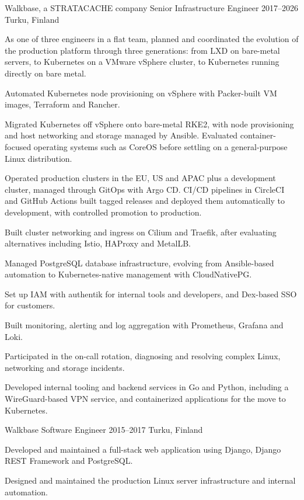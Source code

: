 \cventry
    {Walkbase, a STRATACACHE company}
    {Senior Infrastructure Engineer}
    {2017--2026}
    {Turku, Finland}

\begin{cvitems}
    \item As one of three engineers in a flat team, planned and coordinated
          the evolution of the production platform through three generations:
          from LXD on bare-metal servers, to Kubernetes on a VMware vSphere
          cluster, to Kubernetes running directly on bare metal.
    \item Automated Kubernetes node provisioning on vSphere with Packer-built
          VM images, Terraform and Rancher.
    \item Migrated Kubernetes off vSphere onto bare-metal RKE2, with node
          provisioning and host networking and storage managed by Ansible.
          Evaluated container-focused operating systems such as CoreOS before
          settling on a general-purpose Linux distribution.
    \item Operated production clusters in the EU, US and APAC plus a
          development cluster, managed through GitOps with Argo CD. CI/CD
          pipelines in CircleCI and GitHub Actions built tagged releases and
          deployed them automatically to development, with controlled
          promotion to production.
    \item Built cluster networking and ingress on Cilium and Traefik, after
          evaluating alternatives including Istio, HAProxy and MetalLB.
    \item Managed PostgreSQL database infrastructure, evolving from Ansible-based
          automation to Kubernetes-native management with CloudNativePG.
    \item Set up IAM with authentik for internal tools and developers, and
          Dex-based SSO for customers.
    \item Built monitoring, alerting and log aggregation with Prometheus, Grafana and Loki.
    \item Participated in the on-call rotation, diagnosing and resolving complex
          Linux, networking and storage incidents.
    \item Developed internal tooling and backend services in Go and Python,
          including a WireGuard-based VPN service, and containerized
          applications for the move to Kubernetes.
\end{cvitems}

\vspace{0.5em}

\cventry
    {Walkbase}
    {Software Engineer}
    {2015--2017}
    {Turku, Finland}

\begin{cvitems}
    \item Developed and maintained a full-stack web application using Django,
          Django REST Framework and PostgreSQL.
    \item Designed and maintained the production Linux server infrastructure
          and internal automation.
\end{cvitems}
